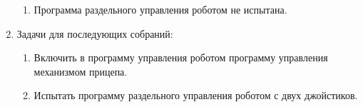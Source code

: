 \begin{enumerate}
\begin{enumerate}
		\item Программа раздельного управления роботом не испытана.
		
	\end{enumerate}
	
	\item Задачи для последующих собраний:
	\begin{enumerate}
		\item Включить в программу управления роботом программу управления механизмом прицепа.
		
		\item Испытать программу раздельного управления роботом с двух джойстиков.
		
	\end{enumerate}     
\end{enumerate}
\fillpage

